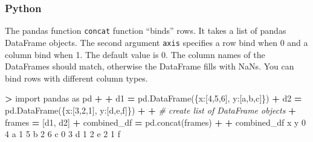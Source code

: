 \documentclass[
]{book}
\newenvironment{Shaded}{\begin{snugshade}}{\end{snugshade}}
\newcommand{\CommentTok}[1]{\textcolor[rgb]{0.56,0.35,0.01}{\textit{#1}}}
\newcommand{\DecValTok}[1]{\textcolor[rgb]{0.00,0.00,0.81}{#1}}
\newcommand{\ImportTok}[1]{#1}
\newcommand{\NormalTok}[1]{#1}
\newcommand{\OperatorTok}[1]{\textcolor[rgb]{0.81,0.36,0.00}{\textbf{#1}}}
\newcommand{\StringTok}[1]{\textcolor[rgb]{0.31,0.60,0.02}{#1}}
\begin{document}
\hypertarget{python-30}{%
\subsubsection*{Python}\label{python-30}}

The pandas function \texttt{concat} function ``binds'' rows. It takes a list of pandas DataFrame objects. The second argument \texttt{axis} specifies a row bind when 0 and a column bind when 1. The default value is 0. The column names of the DataFrames should match, otherwise the DataFrame fills with NaNs. You can bind rows with different column types.

\begin{Shaded}
\begin{Highlighting}[]
\OperatorTok{\textgreater{}} \ImportTok{import}\NormalTok{ pandas }\ImportTok{as}\NormalTok{ pd}
\OperatorTok{+} 
\OperatorTok{+}\NormalTok{ d1 }\OperatorTok{=}\NormalTok{ pd.DataFrame(\{}\StringTok{\textquotesingle{}x\textquotesingle{}}\NormalTok{:[}\DecValTok{4}\NormalTok{,}\DecValTok{5}\NormalTok{,}\DecValTok{6}\NormalTok{], }\StringTok{\textquotesingle{}y\textquotesingle{}}\NormalTok{:[}\StringTok{\textquotesingle{}a\textquotesingle{}}\NormalTok{,}\StringTok{\textquotesingle{}b\textquotesingle{}}\NormalTok{,}\StringTok{\textquotesingle{}c\textquotesingle{}}\NormalTok{]\})}
\OperatorTok{+}\NormalTok{ d2 }\OperatorTok{=}\NormalTok{ pd.DataFrame(\{}\StringTok{\textquotesingle{}x\textquotesingle{}}\NormalTok{:[}\DecValTok{3}\NormalTok{,}\DecValTok{2}\NormalTok{,}\DecValTok{1}\NormalTok{], }\StringTok{\textquotesingle{}y\textquotesingle{}}\NormalTok{:[}\StringTok{\textquotesingle{}d\textquotesingle{}}\NormalTok{,}\StringTok{\textquotesingle{}e\textquotesingle{}}\NormalTok{,}\StringTok{\textquotesingle{}f\textquotesingle{}}\NormalTok{]\})}
\OperatorTok{+} 
\OperatorTok{+} \CommentTok{\# create list of DataFrame objects}
\OperatorTok{+}\NormalTok{ frames }\OperatorTok{=}\NormalTok{ [d1, d2]}
\OperatorTok{+}\NormalTok{ combined\_df }\OperatorTok{=}\NormalTok{ pd.concat(frames)}
\OperatorTok{+} 
\OperatorTok{+}\NormalTok{ combined\_df}
\NormalTok{   x  y}
\DecValTok{0}  \DecValTok{4}\NormalTok{  a}
\DecValTok{1}  \DecValTok{5}\NormalTok{  b}
\DecValTok{2}  \DecValTok{6}\NormalTok{  c}
\DecValTok{0}  \DecValTok{3}\NormalTok{  d}
\DecValTok{1}  \DecValTok{2}\NormalTok{  e}
\DecValTok{2}  \DecValTok{1}\NormalTok{  f}
\end{Highlighting}
\end{Shaded}
\end{document}
